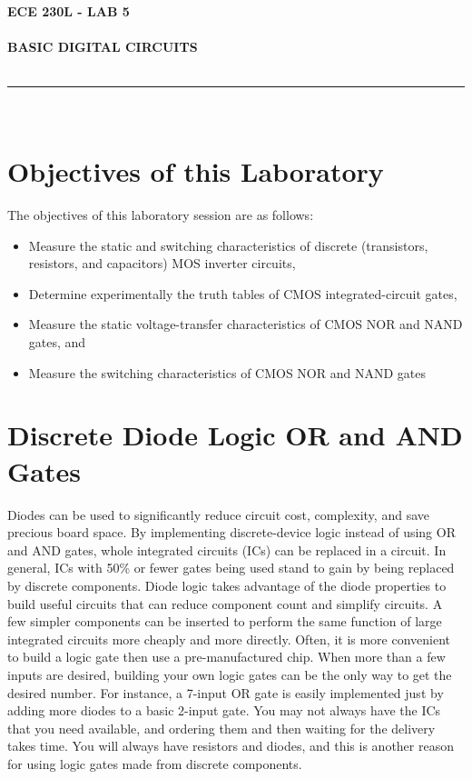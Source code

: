 \documentclass[12pt]{../manual}
\begin{document}
\begin{center}
\textbf{\huge ECE 230L - LAB 5}\\~\\
\textbf{\large BASIC DIGITAL CIRCUITS}\\~\\
\rule{6.5in}{0.5mm}\\
\end{center}

\tableofcontents

\listoffigures

\newpage
%
\section{Objectives of this Laboratory}
The objectives of this laboratory session are as follows:
\begin{itemize}
\item Measure the static and switching characteristics of discrete (transistors, resistors, and
capacitors) MOS inverter circuits,
\item Determine experimentally the truth tables of CMOS integrated-circuit gates,
\item Measure the static voltage-transfer characteristics of CMOS NOR and NAND gates,
and
\item Measure the switching characteristics of CMOS NOR and NAND gates
\end{itemize}

\section{Discrete Diode Logic OR and AND Gates}
Diodes can be used to significantly reduce circuit cost, complexity, and save precious board space. By implementing discrete-device logic instead of using OR and AND gates, whole integrated circuits (ICs) can be replaced in a circuit. In general, ICs with 50\% or fewer gates being used stand to gain by being replaced by discrete components. Diode logic takes advantage of the diode properties to build useful circuits that can reduce component count and simplify circuits. A few simpler components can be inserted to perform the same function of large integrated circuits more cheaply and more directly. Often, it is more convenient to build a logic gate then use a pre-manufactured chip. When more than a few inputs are desired, building your own logic gates can be the only way to get the desired number. For instance, a 7-input OR gate is easily implemented just by adding more diodes to a basic 2-input gate. You may not always have the ICs that you need available, and ordering them and then waiting for the delivery takes time. You will always have resistors and diodes, and this is another reason for using logic gates made from discrete components.
\end{document}
